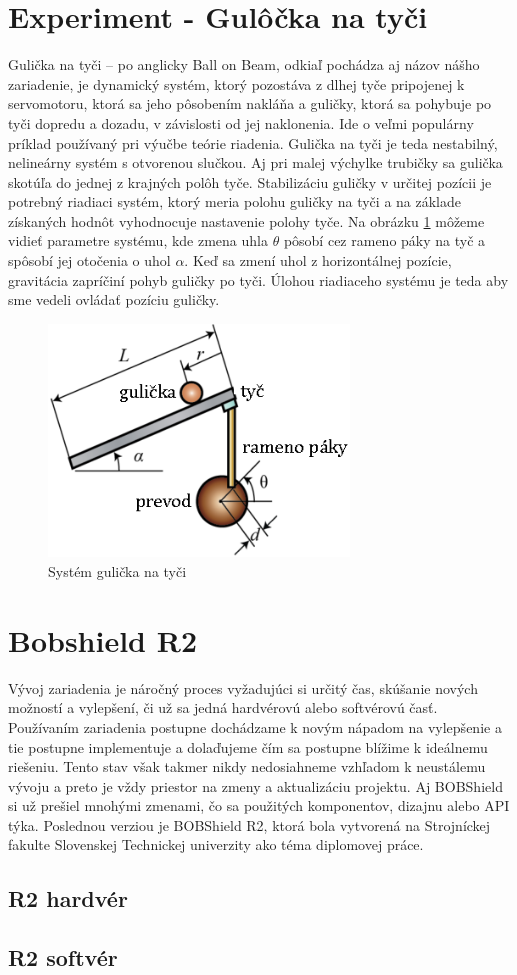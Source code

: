\section{Experiment - Gulôčka na tyči}
\label{kap:1.2}

 Gulička na tyči – po anglicky Ball on Beam, odkiaľ pochádza aj názov nášho zariadenie, je dynamický systém, ktorý pozostáva z dlhej tyče pripojenej k servomotoru, ktorá sa jeho pôsobením nakláňa a guličky, ktorá sa pohybuje po tyči dopredu a dozadu, v závislosti od jej naklonenia. Ide o veľmi populárny príklad používaný pri výučbe teórie riadenia. Gulička na tyči je teda nestabilný, nelineárny systém s otvorenou slučkou. Aj pri malej výchylke trubičky sa gulička skotúľa do jednej z krajných polôh tyče. Stabilizáciu guličky v určitej pozícii je potrebný riadiaci systém, ktorý meria polohu guličky na tyči  a na základe získaných hodnôt vyhodnocuje nastavenie polohy tyče. Na obrázku \ref{OBRAZOK 1.2} môžeme vidieť parametre systému, kde zmena uhla  $\theta$ pôsobí cez rameno páky na tyč a spôsobí jej otočenia o uhol $\alpha$. Keď sa zmení uhol z horizontálnej pozície, gravitácia zapríčiní pohyb guličky po tyči. Úlohou riadiaceho systému je teda aby sme vedeli ovládať pozíciu guličky.


\begin{figure}[!h]
	\centering
	\includegraphics[width=80mm]{obr/experimentBOB.eps}
	\caption{Systém gulička na tyči }\label{OBRAZOK 1.2} 
\end{figure} 

\section{Bobshield R2}
\label{kap:1.3}
Vývoj zariadenia je náročný proces vyžadujúci si určitý čas, skúšanie nových možností a vylepšení, či už sa jedná hardvérovú alebo softvérovú časť. Používaním zariadenia postupne dochádzame k novým nápadom na vylepšenie a tie postupne implementuje a dolaďujeme čím sa postupne blížime k ideálnemu riešeniu. Tento stav však takmer nikdy nedosiahneme vzhľadom k neustálemu vývoju a preto je vždy priestor na zmeny a aktualizáciu projektu. Aj BOBShield si už prešiel mnohými zmenami, čo sa použitých komponentov, dizajnu alebo API  týka. Poslednou verziou je BOBShield R2, ktorá bola vytvorená na Strojníckej fakulte Slovenskej Technickej univerzity ako téma diplomovej práce.  

\subsection{R2 hardvér}
\label{kap:1.3.1}



\subsection{R2 softvér}
\label{kap:1.3.2}


